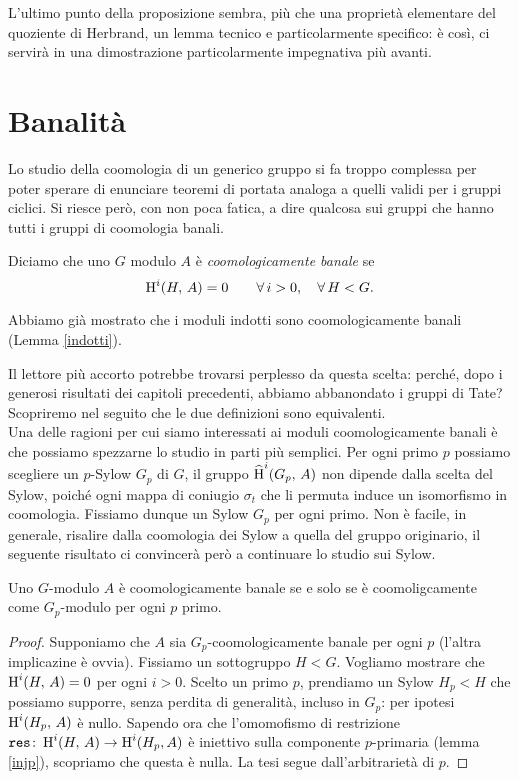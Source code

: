 L'ultimo punto della proposizione sembra, più che una proprietà elementare del quoziente di Herbrand, un lemma tecnico e particolarmente specifico: è così, ci servirà in una dimostrazione particolarmente impegnativa più avanti.

\section{Banalità}
Lo studio della coomologia di un generico gruppo si fa troppo complessa per poter sperare di enunciare teoremi di portata analoga a quelli validi per i gruppi ciclici. Si riesce però, con non poca fatica, a dire qualcosa sui gruppi che hanno tutti i gruppi di coomologia banali.

\begin{definition}
	Diciamo che uno $ G $ modulo $ A $ è \emph{coomologicamente banale} se
	$$  \operatorname{H}^i(H, \, A) = 0 \qquad \forall \, i > 0, \quad  \forall \, H < G.  $$
\end{definition}

\begin{remark}
	Abbiamo già mostrato che i moduli indotti sono coomologicamente banali (Lemma \ref{indotti}).
\end{remark}

Il lettore più accorto potrebbe trovarsi perplesso da questa scelta: perché, dopo i generosi risultati dei capitoli precedenti, abbiamo abbanondato i gruppi di Tate? Scopriremo nel seguito che le due definizioni sono equivalenti. \\

Una delle ragioni per cui siamo interessati ai moduli coomologicamente banali è che possiamo spezzarne lo studio in parti più semplici. Per ogni primo $ p $ possiamo scegliere un $ p $-Sylow $ G_p $ di $ G $, il gruppo $ \operatorname{\widehat{H}}^i(G_p, \, A) $ non dipende dalla scelta del Sylow, poiché ogni mappa di coniugio $ \sigma_t $ che li permuta induce un isomorfismo in coomologia. Fissiamo dunque un Sylow $ G_p $ per ogni primo. Non è facile, in generale, risalire dalla coomologia dei Sylow a quella del gruppo originario, il seguente risultato ci convincerà però a continuare lo studio sui Sylow.

\begin{lemma}
	Uno $ G $-modulo $ A $ è coomologicamente banale se e solo se è coomoligcamente come $ G_p $-modulo per ogni $ p $ primo.
\end{lemma}
\begin{proof}
	Supponiamo che $ A $ sia $ G_p $-coomologicamente banale per ogni $ p $ (l'altra implicazine è ovvia). Fissiamo un sottogruppo $ H < G $. Vogliamo mostrare che
	$  \operatorname{H}^i(H, \, A) = 0 $ per ogni $ i > 0 $. Scelto un primo $ p $, prendiamo un Sylow $ H_p < H $ che possiamo supporre, senza perdita di generalità, incluso in $ G_p $: per ipotesi $ \operatorname{H}^i(H_p, \, A) $ è nullo.
	Sapendo ora che l'omomofismo di restrizione $ \operatorname{\mathtt{res}} \colon \operatorname{H}^i(H, \, A) \to \operatorname{H}^i(H_p, A) $ è iniettivo sulla componente $ p $-primaria (lemma \ref{injp}), scopriamo che questa è nulla. La tesi segue dall'arbitrarietà di $ p $.
	
\end{proof}

